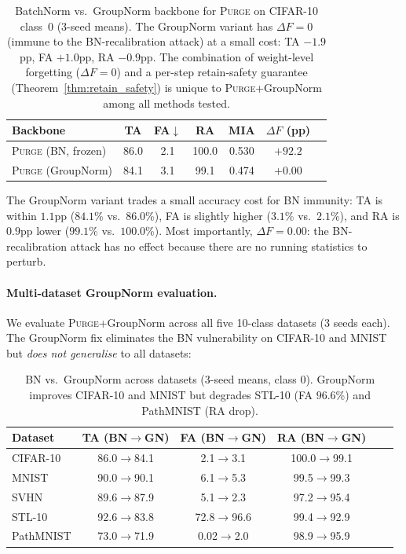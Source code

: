 \documentclass{article}
\newcommand{\ours}{\textsc{Purge}}
\newcommand{\new}[1]{{\color{orange}#1}}
\newcommand{\newpar}[1]{{\color{orange}#1}}
\begin{document}
{\begin{table}[t]
\centering
\small
\begin{tabular}{lcccccc}
\toprule
\textbf{Backbone} & \textbf{TA} & \textbf{FA}$\downarrow$ & \textbf{RA} & \textbf{MIA} & $\Delta F$ \textbf{(pp)} \\
\midrule
\ours{} (BN, frozen)  & \new{86.0}  & \new{2.1}  & \new{100.0}  & \new{0.530} & \new{$+92.2$} \\
\ours{} (GroupNorm)    & \new{84.1} & \new{3.1} & \new{99.1} & \new{0.474} & $\boldsymbol{+0.00}$ \\
\bottomrule
\end{tabular}
\caption{\new{BatchNorm vs.\ GroupNorm backbone for \ours{} on CIFAR-10 class~0 (3-seed means). The GroupNorm variant has $\Delta F = 0$ (immune to the BN-recalibration attack) at a small cost: TA $-1.9$pp, FA $+1.0$pp, RA $-0.9$pp. The combination of weight-level forgetting ($\Delta F = 0$) and a per-step retain-safety guarantee (Theorem~\ref{thm:retain_safety}) is unique to \ours{}+GroupNorm among all methods tested.}}
\label{tab:gn_comparison}
\end{table}

\new{The GroupNorm variant trades a small accuracy cost for BN immunity: TA is within $1.1$pp ($84.1$\% vs.\ $86.0$\%), FA is slightly higher ($3.1$\% vs.\ $2.1$\%), and RA is $0.9$pp lower ($99.1$\% vs.\ $100.0$\%).} Most importantly, $\Delta F = 0.00$: the BN-recalibration attack has no effect because there are no running statistics to perturb.

\newpar{
\paragraph{Multi-dataset GroupNorm evaluation.} We evaluate \ours{}+GroupNorm across all five 10-class datasets (3 seeds each). The GroupNorm fix eliminates the BN vulnerability on CIFAR-10 and MNIST but \emph{does not generalise} to all datasets:

\begin{table}[t]
\centering
\small
\begin{tabular}{lccccc}
\toprule
\textbf{Dataset} & \textbf{TA (BN$\to$GN)} & \textbf{FA (BN$\to$GN)} & \textbf{RA (BN$\to$GN)} \\
\midrule
CIFAR-10 & 86.0$\to$84.1 & 2.1$\to$3.1 & 100.0$\to$99.1 \\
MNIST & 90.0$\to$90.1 & 6.1$\to$5.3 & 99.5$\to$99.3 \\
SVHN & 89.6$\to$87.9 & 5.1$\to$2.3 & 97.2$\to$95.4 \\
STL-10 & 92.6$\to$83.8 & 72.8$\to$96.6 & 99.4$\to$92.9 \\
PathMNIST & 73.0$\to$71.9 & 0.02$\to$2.0 & 98.9$\to$95.9 \\
\bottomrule
\end{tabular}
\caption{BN vs.\ GroupNorm across datasets (3-seed means, class 0). GroupNorm improves CIFAR-10 and MNIST but degrades STL-10 (FA $96.6$\%) and PathMNIST (RA drop).}
\label{tab:gn_multi}
\end{table}

}}
\end{document}
